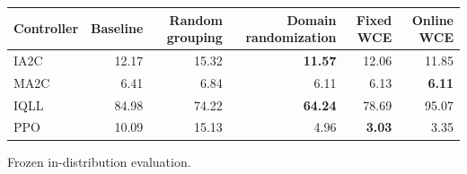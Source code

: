 \begin{tabular}{lrrrrr}
\hline
Controller & Baseline & Random grouping & Domain randomization & Fixed WCE & Online WCE \\
\hline
IA2C & 12.17 & 15.32 & \textbf{11.57} & 12.06 & 11.85 \\
MA2C & 6.41 & 6.84 & 6.11 & 6.13 & \textbf{6.11} \\
IQLL & 84.98 & 74.22 & \textbf{64.24} & 78.69 & 95.07 \\
PPO & 10.09 & 15.13 & 4.96 & \textbf{3.03} & 3.35 \\
\hline
\end{tabular}
Frozen in-distribution evaluation.

